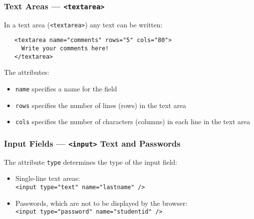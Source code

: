 \documentclass[dvipsnames,handout]{beamer}
\begin{document}
\begin{frame}[fragile]
\frametitle{Text Areas --- \texttt{<textarea>}}
  
  In a text area (\verb+<textarea>+) any text can be written:

\begin{verbatim}
   <textarea name="comments" rows="5" cols="80">
     Write your comments here!
   </textarea>
\end{verbatim}

The attributes:

\begin{itemize}
\item \verb+name+ specifies a name for the field

\item \verb+rows+ specifies the number of lines (rows) in the text area
  
\item \verb+cols+ specifies the number of characters (columns) in each
  line in the text area
\end{itemize}


\end{frame}

\begin{frame}[fragile]
\frametitle{Input Fields --- \texttt{<input>} Text and Passwords}
  
  The attribute \verb+type+ determines the type of the input field:

\begin{itemize}
\item Single-line text areas:\\
\verb+<input type="text" name="lastname" />+


\item Passwords, which are not to be displayed by the browser:\\
  \verb+<input type="password" name="studentid" />+
  
\end{itemize}
\end{frame}
 
\end{document}
